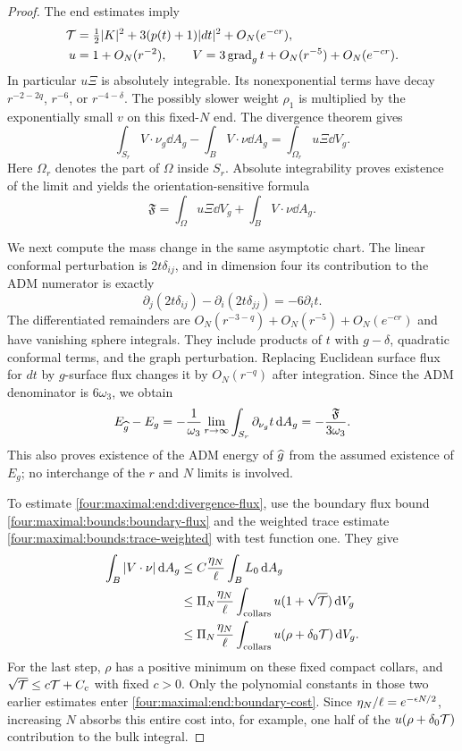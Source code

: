 \begin{proof}
The end estimates imply
\begin{align*}
 \mathcal T&=\tfrac12|K|^2+3(p(t)+1)|dt|^2+O_N(e^{-cr}),\\
 u&=1+O_N(r^{-2}),\qquad
 V=3\operatorname{grad}_g t+O_N(r^{-5})+O_N(e^{-cr}).
\end{align*}
In particular $u\Xi$ is absolutely integrable.  Its nonexponential
terms have decay $r^{-2-2q}$, $r^{-6}$, or $r^{-4-\delta}$.
The possibly slower weight $\rho_1$ is multiplied by the exponentially
small $v$ on this fixed-$N$ end.  The divergence theorem gives
\[
 \int_{S_r}V\cdot\nu_g\dd A_g
    -\int_B V\cdot\nu\dd A_g
       =\int_{\Omega_r}u\Xi\dd V_g.
\]
Here $\Omega_r$ denotes the part of $\Omega$ inside $S_r$.
Absolute integrability proves existence of the limit and yields the
orientation-sensitive formula
\begin{equation}\label{four:maximal:end:divergence-flux}
 \mathfrak F=\int_\Omega u\Xi\dd V_g
                        +\int_B V\cdot\nu\dd A_g.
\end{equation}

We next compute the mass change in the same asymptotic chart.  The
linear conformal perturbation is $2t\delta_{ij}$, and in dimension
four its contribution to the ADM numerator is exactly
\[
 \partial_j(2t\delta_{ij})-\partial_i(2t\delta_{jj})
       =-6\partial_i t.
\]
The differentiated remainders are
$O_N(r^{-3-q})+O_N(r^{-5})+O_N(e^{-cr})$ and have vanishing sphere
integrals.  They include products of $t$ with $g-\delta$, quadratic
conformal terms, and the graph perturbation.  Replacing Euclidean
surface flux for $dt$ by $g$-surface flux changes it by
$O_N(r^{-q})$ after integration.  Since the ADM denominator is
$6\omega_3$, we obtain
\[
 E_{\widehat g}-E_g
   =-\frac1{\omega_3}\lim_{r\to\infty}
                  \int_{S_r}\partial_{\nu_g}t\,\mathrm d A_g
   =-\frac{\mathfrak F}{3\omega_3}.
\]
This also proves existence of the ADM energy of $\widehat g$ from the
assumed existence of $E_g$; no interchange of the $r$ and $N$ limits
is involved.

To estimate \eqref{four:maximal:end:divergence-flux}, use the boundary flux bound
\eqref{four:maximal:bounds:boundary-flux} and the weighted trace estimate
\eqref{four:maximal:bounds:trace-weighted} with test function one.  They give
\begin{align}\label{four:maximal:end:boundary-cost}
 \int_B|V\cdot\nu|\,\mathrm d A_g
 &\le C\frac{\eta_N}{\ell}\int_B L_0\,\mathrm d A_g\notag\\
 &\le\Pi_N\frac{\eta_N}{\ell}
      \int_{\mathrm{collars}}u(1+\sqrt{\mathcal T})\,\mathrm d V_g\notag\\
 &\le\Pi_N\frac{\eta_N}{\ell}
      \int_{\mathrm{collars}}u(\rho+\delta_0\mathcal T)\,\mathrm d V_g.
\end{align}
For the last step, $\rho$ has a positive minimum on these fixed compact
collars, and $\sqrt{\mathcal T}\le c\mathcal T+C_c$ with fixed $c>0$.
Only the polynomial constants in those two earlier estimates enter
\eqref{four:maximal:end:boundary-cost}.  Since $\eta_N/\ell=e^{-\epsilon N/2}$, increasing
$N$ absorbs this entire cost into, for example, one half of the
$u(\rho+\delta_0\mathcal T)$ contribution to the bulk integral.


\end{proof}
